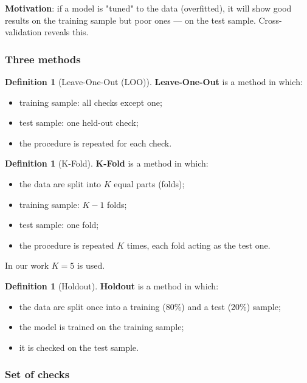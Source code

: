 \documentclass[11pt,a4paper]{article}
\theoremstyle{definition}
\newtheorem{definition}[theorem]{Definition}
\begin{document}
\medskip\noindent
\textbf{Motivation}: if a model is "tuned" to the data
(overfitted), it will show good results on the training
sample but poor ones --- on the test sample. Cross-validation reveals this.

\subsubsection{Three methods}

\begin{definition}[Leave-One-Out (LOO)]
\label{def:loo}
\textbf{Leave-One-Out} is a method in which:
\begin{itemize}
    \item training sample: all checks except one;
    \item test sample: one held-out check;
    \item the procedure is repeated for each check.
\end{itemize}
\end{definition}

\begin{definition}[K-Fold]
\label{def:kfold}
\textbf{K-Fold} is a method in which:
\begin{itemize}
    \item the data are split into $K$ equal parts (folds);
    \item training sample: $K-1$ folds;
    \item test sample: one fold;
    \item the procedure is repeated $K$ times, each fold acting
          as the test one.
\end{itemize}
In our work $K = 5$ is used.
\end{definition}

\begin{definition}[Holdout]
\label{def:holdout}
\textbf{Holdout} is a method in which:
\begin{itemize}
    \item the data are split once into a training (80\%)
          and a test (20\%) sample;
    \item the model is trained on the training sample;
    \item it is checked on the test sample.
\end{itemize}
\end{definition}

\subsubsection{Set of checks}
\end{document}
